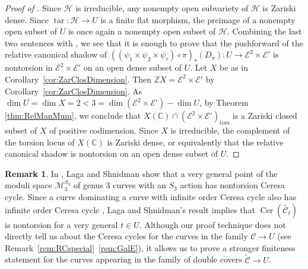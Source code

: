 \documentclass[reqno,10pt]{amsart}
\theoremstyle{definition}
\theoremstyle{definition}
\newtheorem{rem}[thm]{Remark}
\def\C{{\mathbb C}}
\def\Z{{\mathbb Z}}
\def\C{{\mathbb C}}
\DeclareMathOperator{\tar}{tar}
\DeclareMathOperator{\tors}{tors}
\newcommand{\Cer}{\operatorname{Cer}}
\begin{document}
\begin{proof}[Proof of ] Since $\mathcal{H}$ is irreducible, any nonempty open subvariety of $\mathcal{H}$ is Zariski dense. Since $\tar \colon \mathcal{H} \rightarrow U$ is a finite flat morphism, the preimage of a nonempty open subset of $U$ is once again a nonempty open subset of $\mathcal{H}$. Combining the last two sentences with , we see that it is enough to prove that the pushforward of the relative canonical shadow of $((\psi_1\times\psi_2\times\psi_\tau) \circ \pi)_*(D_{\pi}): U \rightarrow \mathcal{E}^2 \times \mathcal{E}'$ is nontorsion in $\mathcal{E}^2 \times \mathcal{E}'$ on an open dense subset of $U$. Let $X$ be as in Corollary~\ref{cor:ZarClosDimension}.
Then $\overline{\Z X} = \mathcal{E}^2\times \mathcal{E}'$ by Corollary~\ref{cor:ZarClosDimension}.   
As $\dim U=\dim X = 2<3 = \dim (\mathcal{E}^2\times \mathcal{E}')-\dim U$, by Theorem \ref{thm:RelManMum}, we conclude that $X(\C)\cap (\mathcal{E}^2\times \mathcal{E}')_{\tors}$ is a Zariski closed subset of $X$ of positive codimension. Since $X$ is irreducible, the complement of the torsion locus of $X(\C)$ is Zariski dense, or equivalently that the relative canonical shadow is nontorsion on an open dense subset of $U$. 
\end{proof}

\begin{rem}\label{rem:S3stratum}
In \cite[Proposition~5.3]{AriJef2}, Laga and Shnidman show that a very general point of the moduli space $\mathcal{M}_3^{S_3}$ of genus $3$ curves with an $S_3$ action has nontorsion Ceresa cycle. Since a curve dominating a curve with infinite order Ceresa cycle also has infinite order Ceresa cycle \cite[Proposition~25]{CerMod}, Laga and Shnidman's result implies that $\Cer(\widetilde{\mathcal{C}_t})$ is nontorsion for a very general $t \in U$. Although our proof technique does not directly tell us about the Ceresa cycles for the curves in the family $\mathcal{C}\rightarrow U$ (see Remark~\ref{rem:RCspecial}~\eqref{rem:GalE}), it allows us to prove a stronger finiteness statement for the curves appearing in the family of double covers $\widetilde{\mathcal{C}} \rightarrow U$. 
\end{rem} 
\printbibliography
\end{document}
